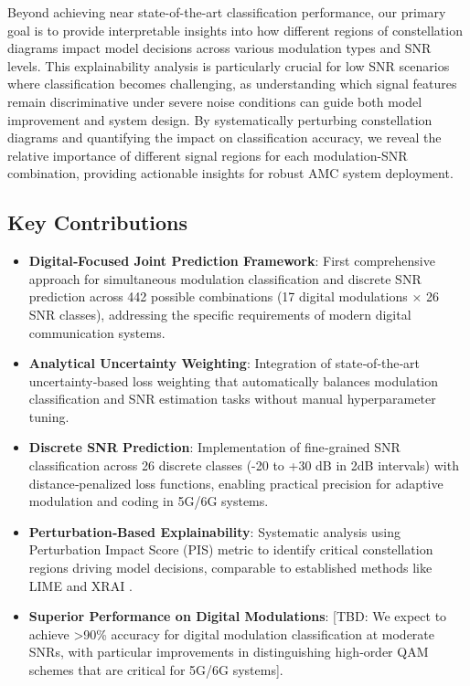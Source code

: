 \documentclass{ELSP}
\begin{document}
Beyond achieving near state-of-the-art classification performance, our primary goal is to provide interpretable insights into how different regions of constellation diagrams impact model decisions across various modulation types and SNR levels. This explainability analysis is particularly crucial for low SNR scenarios where classification becomes challenging, as understanding which signal features remain discriminative under severe noise conditions can guide both model improvement and system design. By systematically perturbing constellation diagrams and quantifying the impact on classification accuracy, we reveal the relative importance of different signal regions for each modulation-SNR combination, providing actionable insights for robust AMC system deployment.

\subsection*{Key Contributions}
\begin{itemize}
\item \textbf{Digital‑Focused Joint Prediction Framework}: First comprehensive approach for simultaneous modulation classification and discrete SNR prediction across 442 possible combinations (17 digital modulations × 26 SNR classes), addressing the specific requirements of modern digital communication systems.
\item \textbf{Analytical Uncertainty Weighting}: Integration of state‑of‑the‑art uncertainty‑based loss weighting that automatically balances modulation classification and SNR estimation tasks without manual hyperparameter tuning.
\item \textbf{Discrete SNR Prediction}: Implementation of fine‑grained SNR classification across 26 discrete classes (-20 to +30 dB in 2dB intervals) with distance‑penalized loss functions, enabling practical precision for adaptive modulation and coding in 5G/6G systems.
\item \textbf{Perturbation‑Based Explainability}: Systematic analysis using Perturbation Impact Score (PIS) metric to identify critical constellation regions driving model decisions, comparable to established methods like LIME \cite{10.1145/2939672.2939778} and XRAI \cite{kapishnikov2019xrai}.
\item \textbf{Superior Performance on Digital Modulations}: [TBD: We expect to achieve >90\% accuracy for digital modulation classification at moderate SNRs, with particular improvements in distinguishing high‑order QAM schemes that are critical for 5G/6G systems].
\end{itemize}
\end{document}

